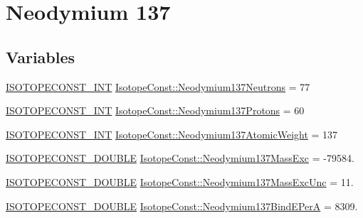 \hypertarget{group___isotope_const-_neodymium-_nd137}{}\section{Neodymium 137}
\label{group___isotope_const-_neodymium-_nd137}
\subsection*{Variables}
\begin{DoxyCompactItemize}
\item 
\mbox{\hyperlink{group___isotope_const-_macros_ga5f18360b3e99483a35c32d789e62621c}{I\+S\+O\+T\+O\+P\+E\+C\+O\+N\+S\+T\+\_\+\+I\+NT}} \mbox{\hyperlink{group___isotope_const-_neodymium-_nd137_ga638bb50c098cc5435033880146d72e70}{Isotope\+Const\+::\+Neodymium137\+Neutrons}} = 77
\item 
\mbox{\hyperlink{group___isotope_const-_macros_ga5f18360b3e99483a35c32d789e62621c}{I\+S\+O\+T\+O\+P\+E\+C\+O\+N\+S\+T\+\_\+\+I\+NT}} \mbox{\hyperlink{group___isotope_const-_neodymium-_nd137_ga3d0424e72a70250b4b05e6ba6eceab98}{Isotope\+Const\+::\+Neodymium137\+Protons}} = 60
\item 
\mbox{\hyperlink{group___isotope_const-_macros_ga5f18360b3e99483a35c32d789e62621c}{I\+S\+O\+T\+O\+P\+E\+C\+O\+N\+S\+T\+\_\+\+I\+NT}} \mbox{\hyperlink{group___isotope_const-_neodymium-_nd137_ga657e8d2d50c54d2628061644e486ad9d}{Isotope\+Const\+::\+Neodymium137\+Atomic\+Weight}} = 137
\item 
\mbox{\hyperlink{group___isotope_const-_macros_ga8f45a7272ce02c0b4c65c44636ed719a}{I\+S\+O\+T\+O\+P\+E\+C\+O\+N\+S\+T\+\_\+\+D\+O\+U\+B\+LE}} \mbox{\hyperlink{group___isotope_const-_neodymium-_nd137_gacf2aa0e468af11c51efa070c92645815}{Isotope\+Const\+::\+Neodymium137\+Mass\+Exc}} = -\/79584.
\item 
\mbox{\hyperlink{group___isotope_const-_macros_ga8f45a7272ce02c0b4c65c44636ed719a}{I\+S\+O\+T\+O\+P\+E\+C\+O\+N\+S\+T\+\_\+\+D\+O\+U\+B\+LE}} \mbox{\hyperlink{group___isotope_const-_neodymium-_nd137_ga9e61e91a16bfcaca58d984de45780001}{Isotope\+Const\+::\+Neodymium137\+Mass\+Exc\+Unc}} = 11.
\item 
\mbox{\hyperlink{group___isotope_const-_macros_ga8f45a7272ce02c0b4c65c44636ed719a}{I\+S\+O\+T\+O\+P\+E\+C\+O\+N\+S\+T\+\_\+\+D\+O\+U\+B\+LE}} \mbox{\hyperlink{group___isotope_const-_neodymium-_nd137_ga75179a3e0235eed3de1d8f2aa39697d8}{Isotope\+Const\+::\+Neodymium137\+Bind\+E\+PerA}} = 8309.
\item 

\end{DoxyCompactItemize}
